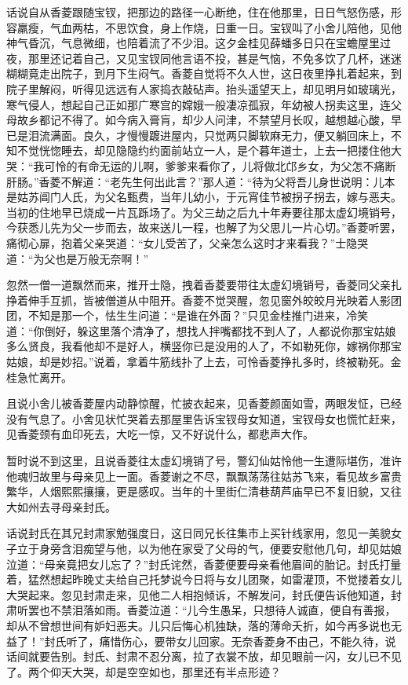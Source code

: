 \documentclass[12pt,oneside]{book}
\begin{document}
话说自从香菱跟随宝钗，把那边的路径一心断绝，住在他那里，日日气怒伤感，形容羸瘦，气血两枯，不思饮食，身上作烧，日重一日。宝钗叫了小舍儿陪他，见他神气昏沉，气息微细，也陪着流了不少泪。这夕金桂见薛蟠多日只在宝蟾屋里过夜，那里还记着自己，又见宝钗同他言语不投，甚是气恼，不免多饮了几杯，迷迷糊糊竟走出院子，到月下生闷气。香菱自觉将不久人世，这日夜里挣扎着起来，到院子里解闷，听得见远远有人家捣衣敲砧声。抬头遥望天上，却见明月如玻璃光，寒气侵人，想起自己正如那广寒宫的嫦娥一般凄凉孤寂，年幼被人拐卖这里，连父母故乡都记不得了。如今病入膏肓，却少人问津，不禁望月长叹，越想越心酸，早已是泪流满面。良久，才慢慢踱进屋内，只觉两只脚软麻无力，便又躺回床上，不知不觉恍惚睡去，却见隐隐约约面前站立一人，是个暮年道士，上去一把搂住他大哭：“我可怜的有命无运的儿啊，爹爹来看你了，儿将做北邙乡女，为父怎不痛断肝肠。”香菱不解道：“老先生何出此言？”那人道：“待为父将吾儿身世说明：儿本是姑苏阊门人氏，为父名甄费，当年儿幼小，于元宵佳节被拐子拐去，嫁与恶夫。当初的住地早已烧成一片瓦跞场了。为父三劫之后九十年寿要往那太虚幻境销号，今获悉儿先为父一步而去，故来送儿一程，也解了为父思儿一片心切。”香菱听罢，痛彻心扉，抱着父亲哭道：“女儿受苦了，父亲怎么这时才来看我？”士隐哭道：“为父也是万般无奈啊！”

忽然一僧一道飘然而来，推开士隐，拽着香菱要带往太虚幻境销号，香菱同父亲扎挣着伸手互抓，皆被僧道从中阻开。香菱不觉哭醒，忽见窗外皎皎月光映着人影团团，不知是那一个，怯生生问道：“是谁在外面？”只见金桂推门进来，冷笑道：“你倒好，躲这里落个清净了，想找人拌嘴都找不到人了，人都说你那宝姑娘多么贤良，我看他却不是好人，横竖你已是没用的人了，不如勒死你，嫁祸你那宝姑娘，却是妙招。”说着，拿着牛筋线扑了上去，可怜香菱挣扎多时，终被勒死。金桂急忙离开。

且说小舍儿被香菱屋内动静惊醒，忙披衣起来，见香菱颜面如雪，两眼发怔，已经没有气息了。小舍见状忙哭着去那屋里告诉宝钗母女知道，宝钗母女也慌忙赶来，见香菱颈有血印死去，大吃一惊，又不好说什么，都悲声大作。

暂时说不到这里，且说香菱往太虚幻境销了号，警幻仙姑怜他一生遭际堪伤，准许他魂归故里与母亲见上一面。香菱谢之不尽，飘飘荡荡往姑苏飞来，看见故乡富贵繁华，人烟熙熙攘攘，更是感叹。当年的十里街仁清巷葫芦庙早已不复旧貌，又往大如州去寻母亲封氏。

话说封氏在其兄封肃家勉强度日，这日同兄长往集市上买针线家用，忽见一美貌女子立于身旁含泪痴望与他，以为他在家受了父母的气，便要安慰他几句，却见姑娘泣道：“母亲竟把女儿忘了？”封氏诧然，香菱便要母亲看他眉间的胎记。封氏打量着，猛然想起昨晚丈夫给自己托梦说今日将与女儿团聚，如雷灌顶，不觉搂着女儿大哭起来。忽见封肃走来，见他二人相抱倾诉，不解发问，封氏便告诉他知道，封肃听罢也不禁泪落如雨。香菱泣道：“儿今生愚呆，只想待人诚直，便自有善报，却从不曾想世间有妒妇恶夫。儿只后悔心机独缺，落的薄命夭折，如今再多说也无益了！”封氏听了，痛惜伤心，要带女儿回家。无奈香菱身不由己，不能久待，说话间就要告别。封氏、封肃不忍分离，拉了衣裳不放，却见眼前一闪，女儿已不见了。两个仰天大哭，却是空空如也，那里还有半点形迹？
\end{document}

